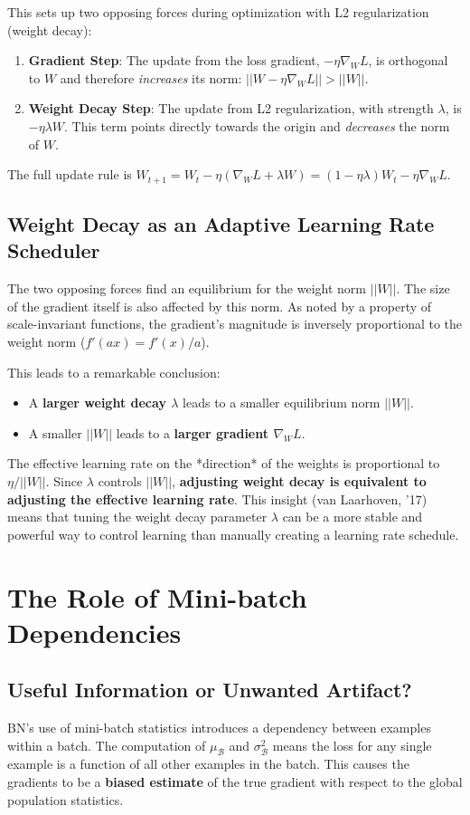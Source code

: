 \documentclass{article}
\begin{document}
This sets up two opposing forces during optimization with L2 regularization (weight decay):
\begin{enumerate}
    \item \textbf{Gradient Step}: The update from the loss gradient, $-\eta \nabla_W L$, is orthogonal to $W$ and therefore \textit{increases} its norm: $||W - \eta \nabla_W L|| > ||W||$.
    \item \textbf{Weight Decay Step}: The update from L2 regularization, with strength $\lambda$, is $-\eta \lambda W$. This term points directly towards the origin and \textit{decreases} the norm of $W$.
\end{enumerate}
The full update rule is $W_{t+1} = W_t - \eta(\nabla_W L + \lambda W) = (1-\eta\lambda)W_t - \eta\nabla_W L$.

\subsection{Weight Decay as an Adaptive Learning Rate Scheduler}
The two opposing forces find an equilibrium for the weight norm $||W||$. The size of the gradient itself is also affected by this norm. As noted by a property of scale-invariant functions, the gradient's magnitude is inversely proportional to the weight norm ($f'(ax) = f'(x)/a$).

This leads to a remarkable conclusion:
\begin{itemize}
    \item A \textbf{larger weight decay $\lambda$} leads to a smaller equilibrium norm $||W||$.
    \item A smaller $||W||$ leads to a \textbf{larger gradient $\nabla_W L$}.
\end{itemize}
The effective learning rate on the *direction* of the weights is proportional to $\eta / ||W||$. Since $\lambda$ controls $||W||$, \textbf{adjusting weight decay is equivalent to adjusting the effective learning rate}. This insight (van Laarhoven, '17) means that tuning the weight decay parameter $\lambda$ can be a more stable and powerful way to control learning than manually creating a learning rate schedule.

\section{The Role of Mini-batch Dependencies}
\subsection{Useful Information or Unwanted Artifact?}
BN's use of mini-batch statistics introduces a dependency between examples within a batch. The computation of $\mu_\mathcal{B}$ and $\sigma_\mathcal{B}^2$ means the loss for any single example is a function of all other examples in the batch. This causes the gradients to be a \textbf{biased estimate} of the true gradient with respect to the global population statistics.
\end{document}
